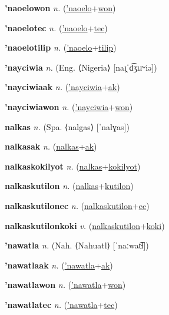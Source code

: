 \textbf{\hypertarget{'naoelowon}{'naoelowon}} \textit{n.} (\hyperlink{'naoelo}{'naoelo}+\allowbreak \hyperlink{won}{won})


\textbf{\hypertarget{'naoelotec}{'naoelotec}} \textit{n.} (\hyperlink{'naoelo}{'naoelo}+\allowbreak \hyperlink{tec}{tec})


\textbf{\hypertarget{'naoelotilip}{'naoelotilip}} \textit{n.} (\hyperlink{'naoelo}{'naoelo}+\allowbreak \hyperlink{tilip}{tilip})


\textbf{\hypertarget{'nayciwia}{'nayciwia}} \textit{n.} (Eng. ⟨Nigeria⟩ [naɪ̯ˈd͡ʒɪɹʷiə])


\textbf{\hypertarget{'nayciwiaak}{'nayciwiaak}} \textit{n.} (\hyperlink{'nayciwia}{'nayciwia}+\allowbreak \hyperlink{ak}{ak})


\textbf{\hypertarget{'nayciwiawon}{'nayciwiawon}} \textit{n.} (\hyperlink{'nayciwia}{'nayciwia}+\allowbreak \hyperlink{won}{won})


\textbf{\hypertarget{nalkas}{nalkas}} \textit{n.} (Spa. ⟨nalgas⟩ [ˈnalɣas])


\textbf{\hypertarget{nalkasak}{nalkasak}} \textit{n.} (\hyperlink{nalkas}{nalkas}+\allowbreak \hyperlink{ak}{ak})


\textbf{\hypertarget{nalkaskokilyot}{nalkaskokilyot}} \textit{n.} (\hyperlink{nalkas}{nalkas}+\allowbreak \hyperlink{kokilyot}{kokilyot})


\textbf{\hypertarget{nalkaskutilon}{nalkaskutilon}} \textit{n.} (\hyperlink{nalkas}{nalkas}+\allowbreak \hyperlink{kutilon}{kutilon})


\textbf{\hypertarget{nalkaskutilonec}{nalkaskutilonec}} \textit{n.} (\hyperlink{nalkaskutilon}{nalkaskutilon}+\allowbreak \hyperlink{ec}{ec})


\textbf{\hypertarget{nalkaskutilonkoki}{nalkaskutilonkoki}} \textit{v.} (\hyperlink{nalkaskutilon}{nalkaskutilon}+\allowbreak \hyperlink{koki}{koki})


\textbf{\hypertarget{'nawatla}{'nawatla}} \textit{n.} (Nah. ⟨Nahuatl⟩ [ˈnaːwat͡ɬ])


\textbf{\hypertarget{'nawatlaak}{'nawatlaak}} \textit{n.} (\hyperlink{'nawatla}{'nawatla}+\allowbreak \hyperlink{ak}{ak})


\textbf{\hypertarget{'nawatlawon}{'nawatlawon}} \textit{n.} (\hyperlink{'nawatla}{'nawatla}+\allowbreak \hyperlink{won}{won})


\textbf{\hypertarget{'nawatlatec}{'nawatlatec}} \textit{n.} (\hyperlink{'nawatla}{'nawatla}+\allowbreak \hyperlink{tec}{tec})


